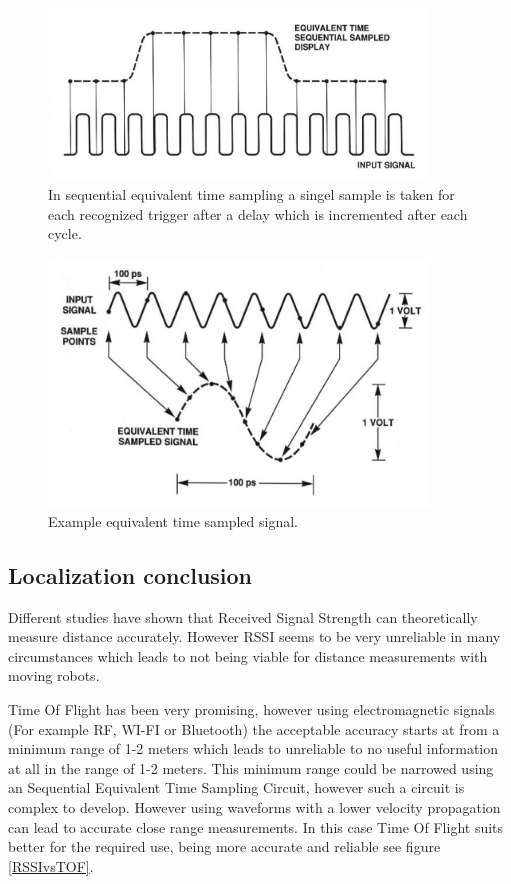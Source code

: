 \documentclass[10pt,a4paper]{article}
\begin{document}
\begin{figure}[H]
\centering
\includegraphics[width=0.9\textwidth]{SETS.png}
\caption{In sequential equivalent time sampling a singel sample is taken for each recognized trigger after a delay which is incremented after each cycle.\cite{SETS}} 
\label{SETS}
\end{figure}

\begin{figure}[H]
\centering
\includegraphics[width=0.9\textwidth]{SETS2.png}
\caption{Example equivalent time sampled signal.\cite{SETS}} 
\label{SETS2}
\end{figure}
\newpage

\subsection{Localization conclusion}
Different studies have shown that Received Signal Strength can theoretically measure distance accurately. However RSSI seems to be very unreliable in many circumstances which leads to not being viable for distance measurements with moving robots. 

Time Of Flight has been very promising, however using electromagnetic signals (For example RF, WI-FI or Bluetooth) the acceptable accuracy starts at from a minimum range of 1-2 meters which leads to unreliable to no useful information at all in the range of 1-2 meters. This minimum range could be narrowed using an Sequential Equivalent Time Sampling Circuit, however such a circuit is complex to develop. However using waveforms with a lower velocity propagation can lead to accurate close range measurements. In this case Time Of Flight suits better for the required use, being more accurate and reliable see figure \ref{RSSIvsTOF}.\cite{TOF}
\end{document}
